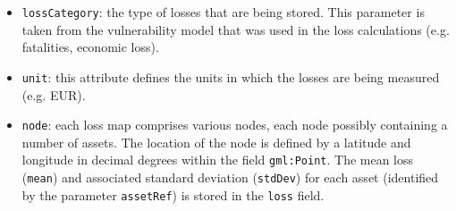 \begin{itemize}

  \item \Verb+lossCategory+: the type of losses that are being stored. This
    parameter is taken from the \gls{vulnerability model} that was used in the
    loss calculations (e.g. fatalities, economic loss).

  \item \Verb+unit+: this attribute defines the units in which the losses are
    being measured (e.g. EUR).

  \item \Verb+node+: each loss map comprises various nodes, each node possibly
    containing a number of \glspl{asset}. The location of the node is defined
    by a latitude and longitude in decimal degrees within the field
    \Verb+gml:Point+. The mean loss (\Verb+mean+) and associated standard
    deviation (\Verb+stdDev+) for each \gls{asset} (identified by the parameter
    \Verb+assetRef+) is stored in the \Verb+loss+ field.

\end{itemize}
